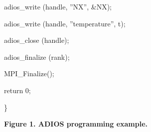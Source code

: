 \vspace{10pt}
adios\_write (handle, ''NX'', \&NX);

\vspace{10pt}
\parindent=28pt
adios\_write (handle, ''temperature'', t);

\vspace{10pt}
\parindent=14pt
adios\_close (handle);

\vspace{10pt}
adios\_finalize (rank);

\vspace{10pt}
\parindent=28pt
MPI\_Finalize();

\vspace{10pt}
\parindent=14pt
return 0;

\vspace{10pt}
\parindent=0pt
\}

\label{HRef119578178}\label{HToc144350161}

\vspace{22pt}
\leftskip=18pt
{\color{color20} \textbf{Figure 1. ADIOS programming example.\label{HToc84890240}\label{HToc212016616}\label{HToc212016858}\label{HToc182553354}}}
